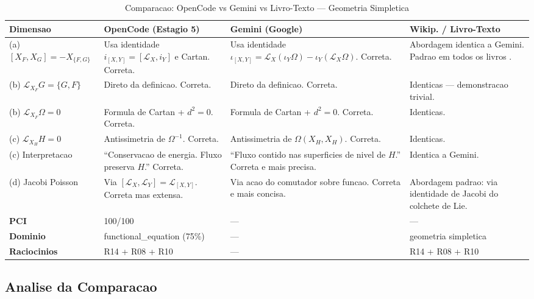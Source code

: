 \documentclass[5p]{elsarticle}
\begin{document}
\begin{table}[H]
  \centering
  \caption{Comparacao: OpenCode vs Gemini vs Livro-Texto — Geometria Simpletica}
  \label{tab:simpletica}
  \scriptsize
  \setlength{\tabcolsep}{3pt}
  \begin{tabular}{p{2cm}p{3.5cm}p{3.5cm}p{3.5cm}}
    \toprule
    \textbf{Dimensao} & \textbf{OpenCode (Estagio 5)} & \textbf{Gemini (Google)} & \textbf{Wikip. / Livro-Texto}\\
    \midrule
    (a) $[X_F,X_G] = -X_{\{F,G\}}$ & Usa identidade $i_{[X,Y]} = [\mathcal{L}_X, i_Y]$ e Cartan. Correta. & Usa identidade $\iota_{[X,Y]} = \mathcal{L}_X(\iota_Y\Omega) - \iota_Y(\mathcal{L}_X\Omega)$. Correta. & Abordagem identica a Gemini. Padrao em todos os livros \cite{wiki2026}.\\
    \rowcolor{greenbg}
    (b) $\mathcal{L}_{X_F}G = \{G,F\}$ & Direto da definicao. Correta. & Direto da definicao. Correta. & Identicas — demonstracao trivial.\\
    (b) $\mathcal{L}_{X_F}\Omega = 0$ & Formula de Cartan + $d^2=0$. Correta. & Formula de Cartan + $d^2=0$. Correta. & Identicas.\\
    \rowcolor{greenbg}
    (c) $\mathcal{L}_{X_H}H = 0$ & Antissimetria de $\Omega^{-1}$. Correta. & Antissimetria de $\Omega(X_H,X_H)$. Correta. & Identicas.\\
    (c) Interpretacao & ``Conservacao de energia. Fluxo preserva $H$.'' Correta. & ``Fluxo contido nas superficies de nivel de $H$.'' Correta e mais precisa. & Identica a Gemini.\\
    \rowcolor{yellowbg}
    (d) Jacobi Poisson & Via $[\mathcal{L}_X,\mathcal{L}_Y] = \mathcal{L}_{[X,Y]}$. Correta mas extensa. & Via acao do comutador sobre funcao. Correta e mais concisa. & Abordagem padrao: via identidade de Jacobi do colchete de Lie.\\
    \midrule
    \textbf{PCI} & 100/100 & — & —\\
    \textbf{Dominio} & functional\_equation (75\%) & — & geometria simpletica\\
    \textbf{Raciocinios} & R14 + R08 + R10 & — & R14 + R08 + R10\\
    \bottomrule
  \end{tabular}
\end{table}

\subsection{Analise da Comparacao}
\end{document}
